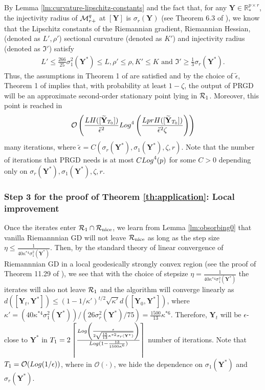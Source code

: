 \documentclass[11pt]{article}
\newcommand{\bbR}{\mathbb{R}}
\newcommand{\0}{{\mathbf{0}}}
\newcommand{\1}{{\mathbf{1}}}
\newcommand{\Y}{{\mathbf{Y}}}
\newcommand{\cR}{{\cal R}}
\newcommand{\cM}{{\cal M}}
\renewcommand{\log}{{\rm Log}}
\begin{document}
{By Lemma \ref{lm:curvature-lipschitz-constants} and the fact that, for any $\Y \in \bbR^{p \times r}_*$, the injectivity radius of $\cM_{r+}^q$ at $[\Y]$ is $\sigma_r(\Y)$ (see Theorem 6.3 of \cite{massart2020quotient}), we know that the Lipschitz constants of the Riemannian gradient, Riemannian Hessian, (denoted as $L', \rho'$) sectional curvature (denoted as $K'$) and injectivity radius (denoted as $\mathfrak{I}'$) satisfy  
\begin{equation*}
	\begin{split}
		L' \leq \frac{266}{25} \sigma_1^2(\Y^*) \leq L, \rho' \leq \rho, K' \leq K \text{ and } \mathfrak{I}' \geq \frac{1}{3} \sigma_r(\Y^*).  
	\end{split}
\end{equation*}
Thus, the assumptions in Theorem 1 of \cite{sun2019escaping} are satisfied and by the choice of $\tilde{\epsilon}$, Theorem 1 of \cite{sun2019escaping} implies that, with probability at least $1 - \zeta$, the output of PRGD will be an approximate second-order stationary point lying in $\cR_1$. Moreover, this point is reached in
\begin{equation*}
	\mathcal{O} \left( \frac{L H([\widetilde{\Y}_{T_0}])}{\tilde{ \epsilon }^2} \log^4 \left( \frac{L pr H([\widetilde{\Y}_{T_0}]) }{\tilde{\epsilon }^2 \zeta} \right) \right)
\end{equation*} many iterations, where $\tilde{\epsilon} = C(\sigma_r(\Y^*), \sigma_1(\Y^*), \zeta, r)$. Note that the number of iterations that PRGD needs is at most $C \log^4(p)$ for some $C > 0$ depending only on $\sigma_r(\Y^*), \sigma_1(\Y^*), \zeta, r$.



\subsubsection{Step 3 for the proof of Theorem \ref{th:application}: Local improvement} \label{sec:proof-local}
Once the iterates enter $\cR_1 \cap \cR_{\text{nice}}$, we learn from Lemma \ref{lm:obsorbing0} that vanilla Riemannnian GD will not leave $\cR_{\text{nice}}$ as long as the step size $\eta \leq \frac{1}{40 \kappa^{*4} \sigma_1^2(\Y^*)}$. Then, by the standard theory of linear convergence of Riemannnian GD in a local geodesically strongly convex region (see the proof of Theorem 11.29 of \cite{boumal2020introduction}), we see that with the choice of stepsize $\eta = \frac{1}{40 \kappa^{*4} \sigma_1^2(\Y^*)}$ the iterates will also not leave $\cR_1$ and the algorithm will converge linearly as $d([\Y_t, \Y^*]) \leq (1-1/\kappa')^{t/2} \sqrt{\kappa'} d([\Y_0, \Y^*])$, where $\kappa' = (40 \kappa^{*4} \sigma_1^2(\Y^*))/(26 \sigma^2_r(\Y^*)/75) = \frac{1500}{13} \kappa^{*6}$. Therefore, $\Y_t$ will be $\epsilon$-close to $\Y^*$ in $T_1 = 2\left\lceil  \frac{\log\left( \frac{\epsilon}{2 \sqrt{ \frac{15}{13} \kappa^{*2} \sigma_r(\Y^*) } } \right)}{\log( 1- \frac{13}{1500 \kappa^{6} } )}  \right\rceil $ number of iterations. Note that $T_1 = \mathcal{O}(\log(1/\epsilon))$, where in $\mathcal{O}(\cdot)$, we hide the dependence on $\sigma_1(\Y^*)$ and $\sigma_r(\Y^*)$.


}
\end{document}

